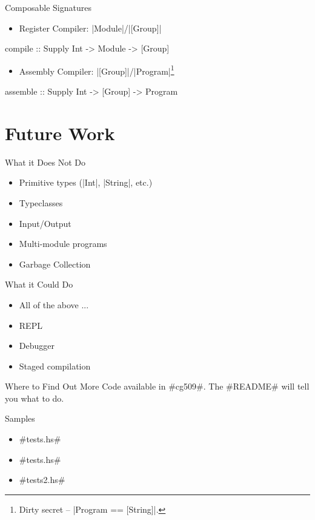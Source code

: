 \documentclass{beamer}
\begin{document}
\begin{frame}[fragile]{Composable Signatures}
  \begin{itemize}
  \item Register Compiler: |Module|/|[Group]|
  \end{itemize}
  
  \begin{code}
   compile :: Supply Int -> Module -> [Group]
  \end{code}
  
\begin{itemize}
  \item Assembly Compiler: |[Group]|/|Program|\footnote[frame]{Dirty secret -- |Program == [String]|.}
  \end{itemize}

  \begin{code}
   assemble :: Supply Int -> [Group] -> Program
 \end{code}

\end{frame}

\section{Future Work}
\begin{frame}{What it Does Not Do}
  \begin{itemize}
  \item Primitive types (|Int|, |String|, etc.)
  \item Typeclasses
  \item Input/Output
  \item Multi-module programs
  \item Garbage Collection
  \end{itemize}
\end{frame}

\begin{frame}{What it Could Do}
  \begin{itemize}
  \item All of the above ...
  \item REPL
  \item Debugger
  \item Staged compilation 
  \end{itemize}
\end{frame}

\begin{frame}[fragile]{Where to Find Out More}
  Code available in #cg509#. The #README# will tell you what to do.
\end{frame}

\begin{frame}[fragile]{Samples}
  \begin{itemize}
  \item #tests\Even.hs#
  \item #tests\Fib.hs# 
  \item #tests\Foldr2.hs# 
  \end{itemize}
\end{frame}
\end{document}
